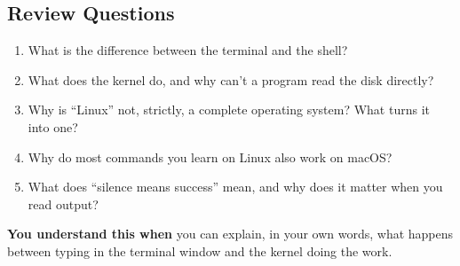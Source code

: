 \subsection*{Review Questions}\label{01-the-machine-behind-the-terminal:review-questions}

\begin{enumerate}
\def\labelenumi{\arabic{enumi}.}
\tightlist
\item
  What is the difference between the terminal and the shell?
\item
  What does the kernel do, and why can't a program read the disk directly?
\item
  Why is ``Linux'' not, strictly, a complete operating system? What turns it into one?
\item
  Why do most commands you learn on Linux also work on macOS?
\item
  What does ``silence means success'' mean, and why does it matter when you read output?
\end{enumerate}

\begin{understandbox}

\textbf{You understand this when} you can explain, in your own words, what happens between typing in the terminal window and the kernel doing the work.

\end{understandbox}
